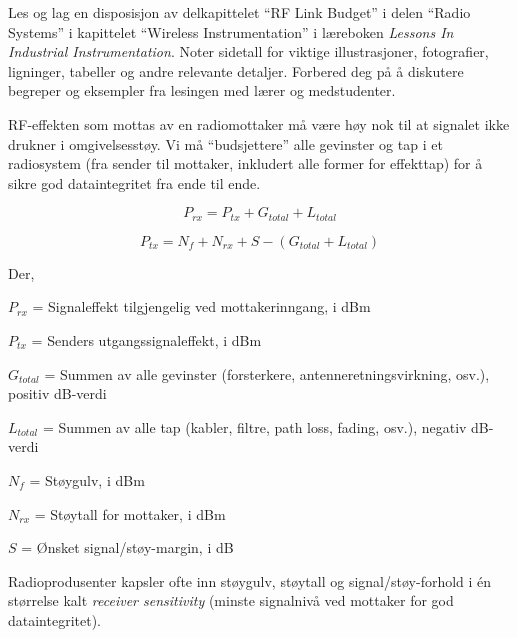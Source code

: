 

Les og lag en disposisjon av delkapittelet ``RF Link Budget'' i delen ``Radio Systems'' i kapittelet ``Wireless Instrumentation'' i læreboken {\it Lessons In Industrial Instrumentation}. Noter sidetall for viktige illustrasjoner, fotografier, ligninger, tabeller og andre relevante detaljer. Forbered deg på å diskutere begreper og eksempler fra lesingen med lærer og medstudenter.














RF-effekten som mottas av en radiomottaker må være høy nok til at signalet ikke drukner i omgivelsesstøy. Vi må ``budsjettere'' alle gevinster og tap i et radiosystem (fra sender til mottaker, inkludert alle former for effekttap) for å sikre god dataintegritet fra ende til ende.

$$P_{rx} = P_{tx} + G_{total} + L_{total}$$

$$P_{tx} = N_f + N_{rx} + S - (G_{total} + L_{total})$$

\noindent
Der,

$P_{rx}$ = Signaleffekt tilgjengelig ved mottakerinngang, i dBm

$P_{tx}$ = Senders utgangssignaleffekt, i dBm

$G_{total}$ = Summen av alle gevinster (forsterkere, antenneretningsvirkning, osv.), positiv dB-verdi

$L_{total}$ = Summen av alle tap (kabler, filtre, path loss, fading, osv.), negativ dB-verdi

$N_f$ = Støygulv, i dBm

$N_{rx}$ = Støytall for mottaker, i dBm

$S$ = Ønsket signal/støy-margin, i dB

\vskip 10pt

Radioprodusenter kapsler ofte inn støygulv, støytall og signal/støy-forhold i én størrelse kalt {\it receiver sensitivity} (minste signalnivå ved mottaker for god dataintegritet).

